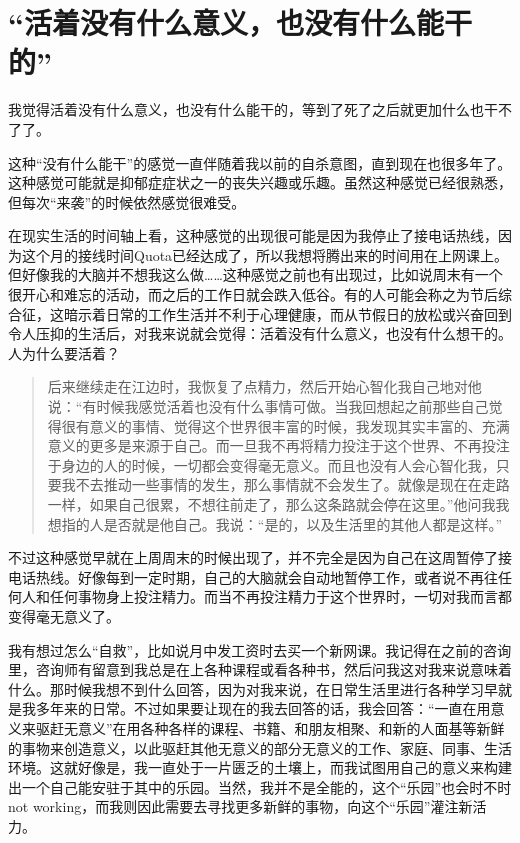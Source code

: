 \chapter{“活着没有什么意义，也没有什么能干的”}



我觉得活着没有什么意义，也没有什么能干的，等到了死了之后就更加什么也干不了了。

这种“没有什么能干”的感觉一直伴随着我以前的自杀意图，直到现在也很多年了。这种感觉可能就是抑郁症症状之一的丧失兴趣或乐趣。虽然这种感觉已经很熟悉，但每次“来袭”的时候依然感觉很难受。

在现实生活的时间轴上看，这种感觉的出现很可能是因为我停止了接电话热线，因为这个月的接线时间Quota已经达成了，所以我想将腾出来的时间用在上网课上。但好像我的大脑并不想我这么做……这种感觉之前也有出现过，比如说周末有一个很开心和难忘的活动，而之后的工作日就会跌入低谷。有的人可能会称之为节后综合征，这暗示着日常的工作生活并不利于心理健康，而从节假日的放松或兴奋回到令人压抑的生活后，对我来说就会觉得：活着没有什么意义，也没有什么想干的。人为什么要活着？

\blockquote{
后来继续走在江边时，我恢复了点精力，然后开始心智化我自己地对他说：“有时候我感觉活着也没有什么事情可做。当我回想起之前那些自己觉得很有意义的事情、觉得这个世界很丰富的时候，我发现其实丰富的、充满意义的更多是来源于自己。而一旦我不再将精力投注于这个世界、不再投注于身边的人的时候，一切都会变得毫无意义。而且也没有人会心智化我，只要我不去推动一些事情的发生，那么事情就不会发生了。就像是现在在走路一样，如果自己很累，不想往前走了，那么这条路就会停在这里。”他问我我想指的人是否就是他自己。我说：“是的，以及生活里的其他人都是这样。”

}

不过这种感觉早就在上周周末的时候出现了，并不完全是因为自己在这周暂停了接电话热线。好像每到一定时期，自己的大脑就会自动地暂停工作，或者说不再往任何人和任何事物身上投注精力。而当不再投注精力于这个世界时，一切对我而言都变得毫无意义了。

我有想过怎么“自救”，比如说月中发工资时去买一个新网课。我记得在之前的咨询里，咨询师有留意到我总是在上各种课程或看各种书，然后问我这对我来说意味着什么。那时候我想不到什么回答，因为对我来说，在日常生活里进行各种学习早就是我多年来的日常。不过如果要让现在的我去回答的话，我会回答：“一直在用意义来驱赶无意义”\pozhehao{}在用各种各样的课程、书籍、和朋友相聚、和新的人面基等新鲜的事物来创造意义，以此驱赶其他无意义的部分\pozhehao{}无意义的工作、家庭、同事、生活环境。这就好像是，我一直处于一片匮乏的土壤上，而我试图用自己的意义来构建出一个自己能安驻于其中的乐园。当然，我并不是全能的，这个“乐园”也会时不时 not working，而我则因此需要去寻找更多新鲜的事物，向这个“乐园”灌注新活力。

